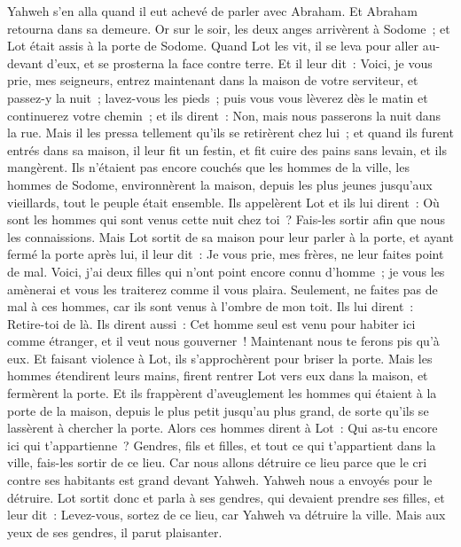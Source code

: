 \begin{multicols}{2}
Yahweh s'en alla quand il eut achevé de parler avec Abraham. Et Abraham retourna dans sa demeure.
\VerseOne{}Or sur le soir, les deux anges arrivèrent à Sodome~; et Lot était assis à la porte de Sodome. Quand Lot les vit, il se leva pour aller au-devant d'eux, et se prosterna la face contre terre.
Et il leur dit~: Voici, je vous prie, mes seigneurs, entrez maintenant dans la maison de votre serviteur, et passez-y la nuit~; lavez-vous les pieds~; puis vous vous lèverez dès le matin et continuerez votre chemin~; et ils dirent~: Non, mais nous passerons la nuit dans la rue.
Mais il les pressa tellement qu'ils se retirèrent chez lui~; et quand ils furent entrés dans sa maison, il leur fit un festin, et fit cuire des pains sans levain, et ils mangèrent.
Ils n'étaient pas encore couchés que les hommes de la ville, les hommes de Sodome, environnèrent la maison, depuis les plus jeunes jusqu'aux vieillards, tout le peuple était ensemble.
Ils appelèrent Lot et ils lui dirent~: Où sont les hommes qui sont venus cette nuit chez toi~? Fais-les sortir afin que nous les connaissions.
Mais Lot sortit de sa maison pour leur parler à la porte, et ayant fermé la porte après lui,
il leur dit~: Je vous prie, mes frères, ne leur faites point de mal.
Voici, j'ai deux filles qui n'ont point encore connu d'homme~; je vous les amènerai et vous les traiterez comme il vous plaira. Seulement, ne faites pas de mal à ces hommes, car ils sont venus à l'ombre de mon toit.
Ils lui dirent~: Retire-toi de là. Ils dirent aussi~: Cet homme seul est venu pour habiter ici comme étranger, et il veut nous gouverner~! Maintenant nous te ferons pis qu'à eux. Et faisant violence à Lot, ils s'approchèrent pour briser la porte.
Mais les hommes étendirent leurs mains, firent rentrer Lot vers eux dans la maison, et fermèrent la porte.
Et ils frappèrent d'aveuglement les hommes qui étaient à la porte de la maison, depuis le plus petit jusqu'au plus grand, de sorte qu'ils se lassèrent à chercher la porte.
Alors ces hommes dirent à Lot~: Qui as-tu encore ici qui t'appartienne~? Gendres, fils et filles, et tout ce qui t'appartient dans la ville, fais-les sortir de ce lieu.
Car nous allons détruire ce lieu parce que le cri contre ses habitants est grand devant Yahweh. Yahweh nous a envoyés pour le détruire.
Lot sortit donc et parla à ses gendres, qui devaient prendre ses filles, et leur dit~: Levez-vous, sortez de ce lieu, car Yahweh va détruire la ville. Mais aux yeux de ses gendres, il parut plaisanter.

\end{multicols}
